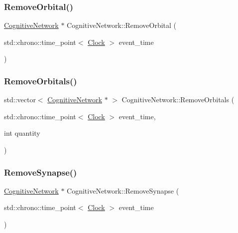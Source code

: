 \mbox{\label{classCognitiveNetwork_a6ed0e198f6dcfdd45d57df5d3ad5754c}} 
\subsubsection{\texorpdfstring{Remove\+Orbital()}{RemoveOrbital()}}
{\footnotesize\ttfamily \mbox{\hyperlink{classCognitiveNetwork}{Cognitive\+Network}} $\ast$ Cognitive\+Network\+::\+Remove\+Orbital (\begin{DoxyParamCaption}\item[{std\+::chrono\+::time\+\_\+point$<$ \mbox{\hyperlink{universe_8h_a0ef8d951d1ca5ab3cfaf7ab4c7a6fd80}{Clock}} $>$}]{event\+\_\+time }\end{DoxyParamCaption})}

\mbox{\label{classCognitiveNetwork_af7834d400995607c2a5a5eac7b5e006d}} 
\subsubsection{\texorpdfstring{Remove\+Orbitals()}{RemoveOrbitals()}}
{\footnotesize\ttfamily std\+::vector$<$ \mbox{\hyperlink{classCognitiveNetwork}{Cognitive\+Network}} $\ast$ $>$ Cognitive\+Network\+::\+Remove\+Orbitals (\begin{DoxyParamCaption}\item[{std\+::chrono\+::time\+\_\+point$<$ \mbox{\hyperlink{universe_8h_a0ef8d951d1ca5ab3cfaf7ab4c7a6fd80}{Clock}} $>$}]{event\+\_\+time,  }\item[{int}]{quantity }\end{DoxyParamCaption})}

\mbox{\label{classCognitiveNetwork_a0764ede1c23caa7022a01657a0e3726b}} 
\subsubsection{\texorpdfstring{Remove\+Synapse()}{RemoveSynapse()}}
{\footnotesize\ttfamily \mbox{\hyperlink{classCognitiveNetwork}{Cognitive\+Network}} $\ast$ Cognitive\+Network\+::\+Remove\+Synapse (\begin{DoxyParamCaption}\item[{std\+::chrono\+::time\+\_\+point$<$ \mbox{\hyperlink{universe_8h_a0ef8d951d1ca5ab3cfaf7ab4c7a6fd80}{Clock}} $>$}]{event\+\_\+time }\end{DoxyParamCaption})}

